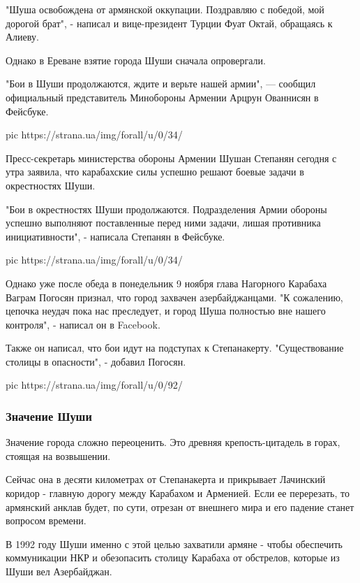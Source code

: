 "Шуша освобождена от армянской оккупации. Поздравляю с победой, мой дорогой
брат", - написал и вице-президент Турции Фуат Октай, обращаясь к Алиеву.

Однако в Ереване взятие города Шуши сначала опровергали. 

"Бои в Шуши продолжаются, ждите и верьте нашей армии", --- сообщил официальный
представитель Минобороны Армении Арцрун Ованнисян в Фейсбуке.

\ifcmt
pic https://strana.ua/img/forall/u/0/34/%
\fi

Пресс-секретарь министерства обороны Армении Шушан Степанян сегодня с утра
заявила, что карабахские силы успешно решают боевые задачи в окрестностях Шуши.

"Бои в окрестностях Шуши продолжаются. Подразделения Армии обороны успешно
выполняют поставленные перед ними задачи, лишая противника инициативности", -
написала Степанян в Фейсбуке.

\ifcmt
pic https://strana.ua/img/forall/u/0/34/%
\fi

Однако уже после обеда в понедельник 9 ноября глава Нагорного Карабаха Ваграм
Погосян признал, что город захвачен азербайджанцами. "К сожалению, цепочка
неудач пока нас преследует, и город Шуша полностью вне нашего контроля", -
написал он в Facebook.

Также он написал, что бои идут на подступах к Степанакерту. "Существование
столицы в опасности", - добавил Погосян.

\ifcmt
pic https://strana.ua/img/forall/u/0/92/%
\fi

\subsubsection{Значение Шуши}

Значение города сложно переоценить. Это древняя крепость-цитадель в горах,
стоящая на возвышении.

Сейчас она в десяти километрах от Степанакерта и прикрывает Лачинский коридор -
главную дорогу между Карабахом и Арменией. Если ее перерезать, то армянский
анклав будет, по сути, отрезан от внешнего мира и его падение станет вопросом
времени. 

В 1992 году Шуши именно с этой целью захватили армяне - чтобы обеспечить
коммуникации НКР и обезопасить столицу Карабаха от обстрелов, которые из Шуши
вел Азербайджан.

